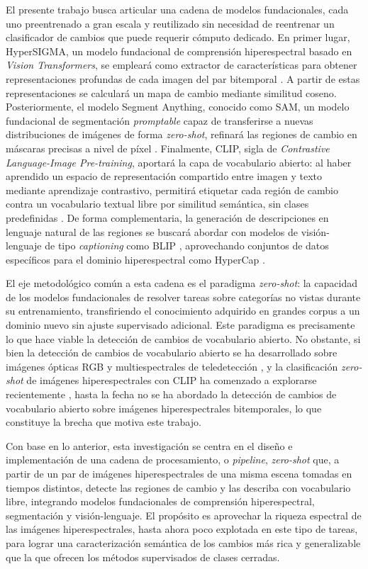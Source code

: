 El presente trabajo busca articular una cadena de modelos fundacionales, cada uno preentrenado a gran escala y reutilizado sin necesidad de reentrenar un clasificador de cambios que puede requerir cómputo dedicado. En primer lugar, HyperSIGMA, un modelo fundacional de comprensión hiperespectral basado en \textit{Vision Transformers}, se empleará como extractor de características para obtener representaciones profundas de cada imagen del par bitemporal \parencite{wang2024hypersigma}. A partir de estas representaciones se calculará un mapa de cambio mediante similitud coseno. Posteriormente, el modelo Segment Anything, conocido como SAM, un modelo fundacional de segmentación \textit{promptable} capaz de transferirse a nuevas distribuciones de imágenes de forma \textit{zero-shot}, refinará las regiones de cambio en máscaras precisas a nivel de píxel \parencite{kirillov2023sam}. Finalmente, CLIP, sigla de \textit{Contrastive Language-Image Pre-training}, aportará la capa de vocabulario abierto: al haber aprendido un espacio de representación compartido entre imagen y texto mediante aprendizaje contrastivo, permitirá etiquetar cada región de cambio contra un vocabulario textual libre por similitud semántica, sin clases predefinidas \parencite{radford2021clip}. De forma complementaria, la generación de descripciones en lenguaje natural de las regiones se buscará abordar con modelos de visión-lenguaje de tipo \textit{captioning} como BLIP \parencite{li2022blip}, aprovechando conjuntos de datos específicos para el dominio hiperespectral como HyperCap \parencite{das2025hypercap}.

El eje metodológico común a esta cadena es el paradigma \textit{zero-shot}: la capacidad de los modelos fundacionales de resolver tareas sobre categorías no vistas durante su entrenamiento, transfiriendo el conocimiento adquirido en grandes corpus a un dominio nuevo sin ajuste supervisado adicional. Este paradigma es precisamente lo que hace viable la detección de cambios de vocabulario abierto. No obstante, si bien la detección de cambios de vocabulario abierto se ha desarrollado sobre imágenes ópticas RGB y multiespectrales de teledetección \parencite{zhu2025semanticcd}, y la clasificación \textit{zero-shot} de imágenes hiperespectrales con CLIP ha comenzado a explorarse recientemente \parencite{pang2025special}, hasta la fecha no se ha abordado la detección de cambios de vocabulario abierto sobre imágenes hiperespectrales bitemporales, lo que constituye la brecha que motiva este trabajo.

Con base en lo anterior, esta investigación se centra en el diseño e implementación de una cadena de procesamiento, o \textit{pipeline}, \textit{zero-shot} que, a partir de un par de imágenes hiperespectrales de una misma escena tomadas en tiempos distintos, detecte las regiones de cambio y las describa con vocabulario libre, integrando modelos fundacionales de comprensión hiperespectral, segmentación y visión-lenguaje. El propósito es aprovechar la riqueza espectral de las imágenes hiperespectrales, hasta ahora poco explotada en este tipo de tareas, para lograr una caracterización semántica de los cambios más rica y generalizable que la que ofrecen los métodos supervisados de clases cerradas.


